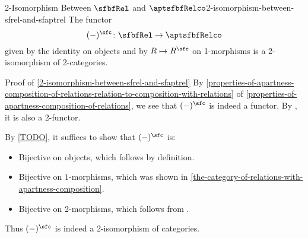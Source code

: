 \begin{proposition}{2-Isomorphism Between $\sfbfRel$ and $\aptsfbfRelco$}{2-isomorphism-between-sfrel-and-sfaptrel}%
    The functor
    \[
        (-)^{\sfc}%
        \colon%
        \sfbfRel%
        \to%
        \aptsfbfRelco%
    \]%
    given by the identity on objects and by $R\mapsto R^{\sfc}$ on 1-morphisms is a 2-isomorphism of 2-categories.
\end{proposition}
\begin{Proof}{Proof of \cref{2-isomorphism-between-sfrel-and-sfaptrel}}%
    By \cref{properties-of-apartness-composition-of-relations-relation-to-composition-with-relations} of \cref{properties-of-apartness-composition-of-relations}, we see that $(-)^{\sfc}$ is indeed a functor. By , it is also a 2-functor.

    \indent By \cref{TODO}, it suffices to show that $(-)^{\sfc}$ is:
    \begin{itemize}
        \item Bijective on objects, which follows by definition.
        \item Bijective on $1$-morphisms, which was shown in \cref{the-category-of-relations-with-apartness-composition}.
        \item Bijective on 2-morphisms, which follows from .
    \end{itemize}
    Thus $(-)^{\sfc}$ is indeed a 2-isomorphism of categories.
\end{Proof}

